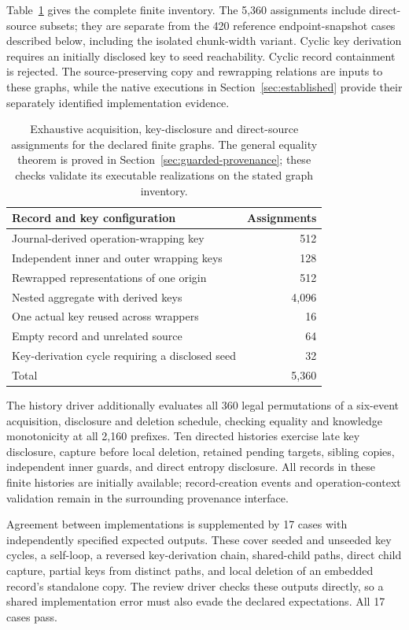 \documentclass[pdflatex]{sn-jnl}
\theoremstyle{thmstyleone}
\theoremstyle{thmstylethree}
\theoremstyle{thmstyletwo}
\begin{document}
Table~\ref{tab:guarded-checks} gives the complete finite inventory. The 5,360
assignments include direct-source subsets; they are separate from the 420
reference endpoint-snapshot cases described below, including the isolated
chunk-width variant. Cyclic key derivation requires
an initially disclosed key to seed reachability. Cyclic record containment is
rejected. The source-preserving copy and rewrapping relations are inputs to
these graphs, while the native executions in Section~\ref{sec:established}
provide their separately identified implementation evidence.

\begin{table}[t]
\centering
\small
\begin{tabularx}{\linewidth}{@{}Xr@{}}
\toprule
Record and key configuration & Assignments\\
\midrule
Journal-derived operation-wrapping key & 512\\
Independent inner and outer wrapping keys & 128\\
Rewrapped representations of one origin & 512\\
Nested aggregate with derived keys & 4,096\\
One actual key reused across wrappers & 16\\
Empty record and unrelated source & 64\\
Key-derivation cycle requiring a disclosed seed & 32\\
\midrule
Total & 5,360\\
\bottomrule
\end{tabularx}
\caption{Exhaustive acquisition, key-disclosure and direct-source assignments
for the declared finite graphs. The general equality theorem is proved in
Section~\ref{sec:guarded-provenance}; these checks validate its executable
realizations on the stated graph inventory.}
\label{tab:guarded-checks}
\end{table}

The history driver additionally evaluates all 360 legal permutations of a
six-event acquisition, disclosure and deletion schedule, checking equality
and knowledge monotonicity at all 2,160 prefixes. Ten directed histories
exercise late key disclosure, capture before local deletion, retained pending
targets, sibling copies, independent inner guards, and direct entropy
disclosure. All records in these finite histories are initially available;
record-creation events and operation-context validation remain in the
surrounding provenance interface.

Agreement between implementations is supplemented by 17 cases with
independently specified expected outputs. These cover seeded and unseeded
key cycles, a self-loop, a reversed key-derivation chain, shared-child paths,
direct child capture, partial keys from distinct paths, and local deletion
of an embedded record's standalone copy. The review driver checks these
outputs directly, so a shared implementation error must also evade the
declared expectations. All 17 cases pass.
\end{document}
